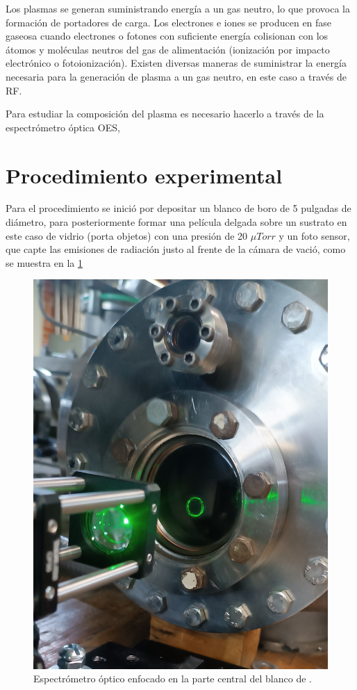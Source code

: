 \documentclass[12pt]{IEEEtran}
\begin{document}
Los plasmas \cite{plasmaaaaa} se generan suministrando energía a un gas neutro, lo que provoca la formación de portadores de carga. Los electrones e iones se producen en fase gaseosa cuando electrones o fotones con suficiente energía colisionan con los átomos y moléculas neutros del gas de alimentación (ionización por impacto electrónico o fotoionización). Existen diversas maneras de suministrar la energía necesaria para la generación de plasma a un gas neutro, en este caso a través de RF.

Para estudiar la composición del plasma es necesario hacerlo a través de la espectrómetro óptica OES, 

\section{Procedimiento experimental}

Para el procedimiento se inició por depositar un blanco de boro de 5 pulgadas de diámetro, para posteriormente formar una película delgada sobre un sustrato en este caso de vidrio (porta objetos) con una presión de 20 $\mu Torr$ y un foto sensor, que capte las emisiones de radiación justo al frente de la cámara de vació, como se muestra en la \cref{fig:Espectometro}


\begin{figure}[htp]
	\centering
	\includegraphics[width=0.6\linewidth]{figs/buenaaaaaaaaa.jpg}
	\caption{Espectrómetro óptico enfocado en la parte central del blanco de .}
	\label{fig:Espectometro}
\end{figure}
\end{document}
